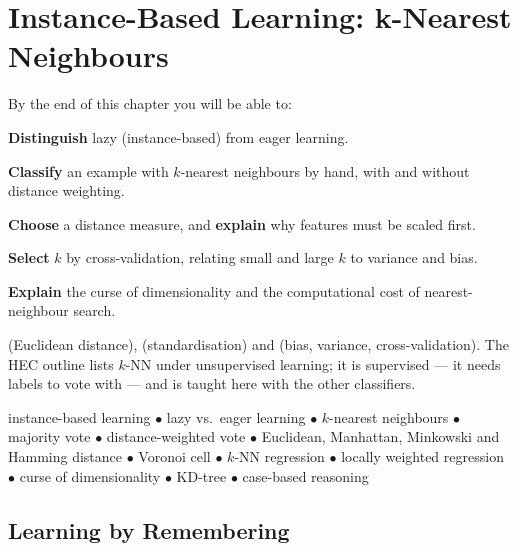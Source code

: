 \chapter{Instance-Based Learning: k-Nearest Neighbours}\label{ch:knn}

\begin{outcomes}
By the end of this chapter you will be able to:
\begin{tight}
  \item \textbf{Distinguish} lazy (instance-based) from eager learning.
  \item \textbf{Classify} an example with $k$-nearest neighbours by hand, with
        and without distance weighting.
  \item \textbf{Choose} a distance measure, and \textbf{explain} why features
        must be scaled first.
  \item \textbf{Select} $k$ by cross-validation, relating small and large $k$ to
        variance and bias.
  \item \textbf{Explain} the curse of dimensionality and the computational cost
        of nearest-neighbour search.
\end{tight}
\end{outcomes}

\begin{prereq}
 (Euclidean distance),  (standardisation) and
 (bias, variance, cross-validation). The HEC outline lists
$k$-NN under unsupervised learning; it is supervised --- it needs labels to vote
with --- and is taught here with the other classifiers.
\end{prereq}

\begin{keyterms}
instance-based learning $\bullet$ lazy vs.\ eager learning $\bullet$
$k$-nearest neighbours $\bullet$ majority vote $\bullet$ distance-weighted vote
$\bullet$ Euclidean, Manhattan, Minkowski and Hamming distance $\bullet$ Voronoi
cell $\bullet$ $k$-NN regression $\bullet$ locally weighted regression $\bullet$
curse of dimensionality $\bullet$ KD-tree $\bullet$ case-based reasoning
\end{keyterms}

\section{Learning by Remembering}

